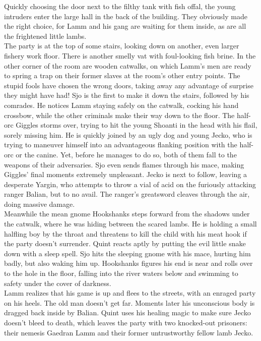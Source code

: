 Quickly choosing the door next to the filthy tank with fish offal, the young intruders enter the large hall in the back of the building. They obviously made the right choice, for Lamm and his gang are waiting for them inside, as are all the frightened little lambs.\\

The party is at the top of some stairs, looking down on another, even larger fishery work floor. There is another smelly vat with foul-looking fish brine. In the other corner of the room are wooden catwalks, on which Lamm's men are ready to spring a trap on their former slaves at the room's other entry points. The stupid fools have chosen the wrong doors, taking away any advantage of surprise they might have had! Sjo is the first to make it down the stairs, followed by his comrades. He notices Lamm staying safely on the catwalk, cocking his hand crossbow, while the other criminals make their way down to the floor. The half-orc Giggles storms over, trying to hit the young Shoanti in the head with his flail, sorely missing him. He is quickly joined by an ugly dog and young Jecko, who is trying to maneuver himself into an advantageous flanking position with the half-orc or the canine. Yet, before he manages to do so, both of them fall to the weapons of their adversaries. Sjo even sends flames through his mace, making Giggles' final moments extremely unpleasant. Jecko is next to follow, leaving a desperate Yargin, who attempts to throw a vial of acid on the furiously attacking ranger Balian, but to no avail. The ranger's greatsword cleaves through the air, doing massive damage.\\

Meanwhile the mean gnome Hookshanks steps forward from the shadows under the catwalk, where he was hiding between the scared lambs. He is holding a small halfling boy by the throat and threatens to kill the child with his meat hook if the party doesn't surrender. Quint reacts aptly by putting the evil little snake down with a sleep spell. Sjo hits the sleeping gnome with his mace, hurting him badly, but also waking him up. Hookshanks figures his end is near and rolls over to the hole in the floor, falling into the river waters below and swimming to safety under the cover of darkness.\\

Lamm realizes that his game is up and flees to the streets, with an enraged party on his heels. The old man doesn't get far. Moments later his unconscious body is dragged back inside by Balian. Quint uses his healing magic to make sure Jecko doesn't bleed to death, which leaves the party with two knocked-out prisoners: their nemesis Gaedran Lamm and their former untrustworthy fellow lamb Jecko.\\

